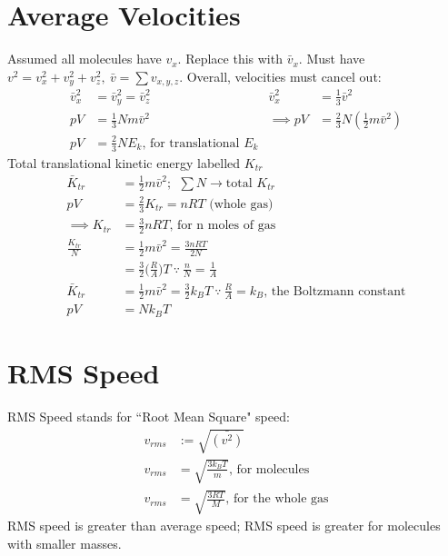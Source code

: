 \documentclass[a4paper, 11pt, normalem]{report}
\begin{document}
\section{Average Velocities}
Assumed all molecules have $v_{x}$.
Replace this with $\bar{v}_{x}$.
Must have $v^{2} = v_{x}^{2} + v_{y}^{2} + v_{z}^{2},~ \bar{v} = \sum v_{x,y,z}$.
Overall, velocities must cancel out:
\begin{align}
    \bar{v}_{x}^{2} &= \bar{v}_{y}^{2} = \bar{v}_{z}^{2} & \bar{v}_{x}^{2} &= \frac{1}{3}\bar{v}^{2} \\
    pV &= \frac{1}{3}Nm\bar{v}^{2} & \implies pV &= \frac{2}{3}N(\frac{1}{2}m\bar{v}^{2}) \\
    pV &= \frac{2}{3}NE_{k} \text{, for translational }E_{k} &
\end{align}
Total translational kinetic energy labelled $K_{tr}$
\begin{align}
    \bar{K}_{tr} &= \frac{1}{2}m\bar{v}^{2};~~ \sum N \rightarrow \text{total }K_{tr} \\
    pV &= \frac{2}{3}K_{tr} = nRT \text{ (whole gas)} \\
    \implies K_{tr} &= \frac{3}{2}nRT\text{, for n moles of gas} \\
    \frac{K_{tr}}{N} &= \frac{1}{2}m\bar{v}^{2} = \frac{3nRT}{2N} \\
                     &= \frac{3}{2}\Big(\frac{R}{A}\Big)T ~\because~ \frac{n}{N} = \frac{1}{A} \\
    \bar{K}_{tr} &= \frac{1}{2}m\bar{v}^{2} = \frac{3}{2}k_{B}T ~\because~ \frac{R}{A} = k_{B}\text{, the Boltzmann constant} \\
    pV &= Nk_{B}T
\end{align}

\section{RMS Speed}
RMS Speed stands for ``Root Mean Square" speed:
\begin{align}
    v_{rms} &:= \sqrt{\bar{(v^{2})}} \\
    v_{rms} &= \sqrt{\frac{3k_{B}T}{m}}\text{, for molecules} \\
    v_{rms} &= \sqrt{\frac{3RT}{M}}\text{, for the whole gas}
\end{align}
RMS speed is greater than average speed; RMS speed is greater for molecules with smaller masses.
\end{document}

